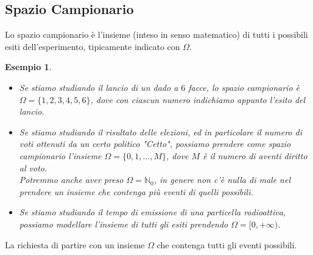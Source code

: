 \documentclass[11pt]{book}
\theoremstyle{Definizione}
\theoremstyle{TeoremaProposizioneLemmaCorollario}
\theoremstyle{OsservazioneNota}
\newtheorem{myes}{Esempio}[section]
\newcommand{\N}{\mathbb{N}}
\begin{document}
\subsection{Spazio Campionario}
Lo spazio campionario è l'insieme (inteso in senso matematico) di tutti i possibili esiti dell'esperimento, tipicamente indicato con $\Omega$.
\begin{myes}\label{es:EsempioSpazioCampionarioABC}\hfill
\begin{itemize}
\item[$(a)$] Se stiamo studiando il lancio di un dado a $6$ facce, lo spazio campionario è $\Omega = \{1,2,3,4,5,6\}$, dove con ciascun numero indichiamo appunto l'esito del lancio.
\item[$(b)$] Se stiamo studiando il risultato delle elezioni, ed in particolare il numero di voti ottenuti da un certo politico "Cetto", possiamo prendere come spazio campionario l'insieme $\Omega = \{0,1,\dots,M\}$, dove $M$ è il numero di aventi diritto al voto.\\
Potremmo anche aver preso $\Omega = \N_0$, in genere non c'è nulla di male nel prendere un insieme che contenga più eventi di quelli possibili.
\item[$(c)$] Se stiamo studiando il tempo di emissione di una particella radioattiva, possiamo modellare l'insieme di tutti gli esiti prendendo $\Omega = [0,+\infty)$.
\end{itemize}
\end{myes}
La richiesta di partire con un insieme $\Omega$ che contenga tutti gli eventi possibili.
\end{document}
